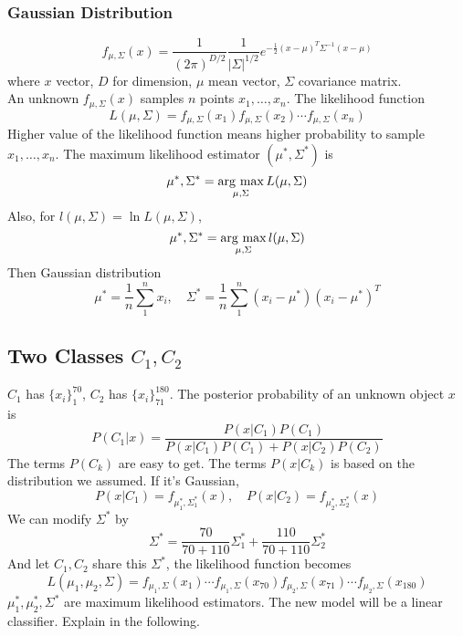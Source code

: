 \documentclass[../main.tex]{subfiles}
\begin{document}
            \subsubsection{Gaussian Distribution}
                \[
                    f_{\mu,\Sigma}(x)=\frac{1}{(2\pi)^{D/2}}\frac{1}{|\Sigma|^{1/2}}e^{-\frac{1}{2}(x-\mu)^T\Sigma^{-1}(x-\mu)}
                \]
                where $x$ vector, $D$ for dimension, $\mu$ mean vector, $\Sigma$ covariance matrix.\\
                An unknown $f_{\mu,\Sigma}(x)$ samples $n$ points $x_1,\dots,x_n$. The likelihood function
                \[
                    L(\mu,\Sigma)=f_{\mu,\Sigma}(x_1)f_{\mu,\Sigma}(x_2)\cdots f_{\mu,\Sigma}(x_n)
                \]
                Higher value of the likelihood function means higher probability to sample $x_1,\dots,x_n$. The maximum likelihood estimator $(\mu^*,\Sigma^*)$ is
                \[
                    \mu^*,\Sigma^* = \operatorname*{arg~max}_{\mu,\Sigma} L(\mu,\Sigma)
                \]
                Also, for $l(\mu,\Sigma)=\ln L(\mu,\Sigma)$,
                \[
                    \mu^*,\Sigma^* = \operatorname*{arg~max}_{\mu,\Sigma} l(\mu,\Sigma)
                \]
                Then Gaussian distribution
                \[\mu^* = \frac{1}{n}\sum_1^n x_i,\quad \Sigma^* = \frac{1}{n}\sum_1^n(x_i-\mu^*)(x_i-\mu^*)^T\]
    
        \subsection{Two Classes \texorpdfstring{$C_1,C_2$}{}}
            $C_1$ has $\{x_i\}_1^{70}$, $C_2$ has $\{x_i\}_{71
            }^{180}$. The posterior probability of an unknown object $x$ is
            \[
                P(C_1|x) = \frac{P(x|C_1)P(C_1)}{P(x|C_1)P(C_1)+P(x|C_2)P(C_2)}
            \]
            The terms $P(C_k)$ are easy to get. The terms $P(x|C_k)$ is based on the distribution we assumed. If it's Gaussian,
            \[
                P(x|C_1) = f_{\mu_1^*,\Sigma_1^*}(x),\quad P(x|C_2) = f_{\mu_2^*,\Sigma_2^*}(x)
            \]
            We can modify $\Sigma^*$ by
            \[
                \Sigma^* = \frac{70}{70+110}\Sigma_1^* + \frac{110}{70+110}\Sigma_2^*
            \]
            And let $C_1,C_2$ share this $\Sigma^*$, the likelihood function becomes
            \[
                L(\mu_1,\mu_2,\Sigma) = f_{\mu_1,\Sigma}(x_1)\cdots f_{\mu_1,\Sigma}(x_{70})f_{\mu_2,\Sigma}(x_{71})\cdots f_{\mu_2,\Sigma}(x_{180})
            \]
            $\mu_1^*,\mu_2^*,\Sigma^*$ are maximum likelihood estimators.
            The new model will be a linear classifier. Explain in the following.
\end{document}
